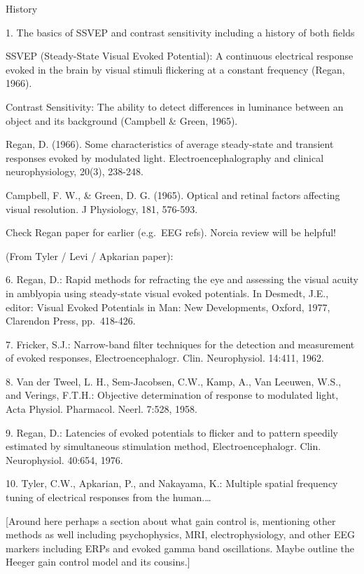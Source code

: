 \documentclass[
  letterpaper,
  DIV=11,
  numbers=noendperiod]{scrartcl}
\begin{document}
\label{anchor-2}{}History

\label{anchor-3}{}1. The basics of SSVEP and contrast
sensitivity including a history of both fields

SSVEP (Steady-State Visual Evoked Potential): A continuous electrical
response evoked in the brain by visual stimuli flickering at a constant
frequency (Regan, 1966).

Contrast Sensitivity: The ability to detect differences in luminance
between an object and its background (Campbell \& Green, 1965).

Regan, D. (1966). Some characteristics of average steady-state and
transient responses evoked by modulated light. Electroencephalography
and clinical neurophysiology, 20(3), 238-248.

Campbell, F. W., \& Green, D. G. (1965). Optical and retinal factors
affecting visual resolution. J Physiology, 181, 576-593.

Check Regan paper for earlier (e.g.~EEG refs). Norcia review will be
helpful!

(From Tyler / Levi / Apkarian paper):

6. Regan, D.: Rapid methods for refracting the eye and assessing the
visual acuity in amblyopia using steady-state visual evoked potentials.
In Desmedt, J.E., editor: Visual Evoked Potentials in Man: New
Developments, Oxford, 1977, Clarendon Press, pp.~418-426.

7. Fricker, S.J.: Narrow-band filter techniques for the detection and
measurement of evoked responses, Electroencephalogr. Clin. Neurophysiol.
14:411, 1962.

8. Van der Tweel, L. H., Sem-Jacobsen, C.W., Kamp, A., Van Leeuwen,
W.S., and Verings, F.T.H.: Objective determination of response to
modulated light, Acta Physiol. Pharmacol. Neerl. 7:528, 1958.

9. Regan, D.: Latencies of evoked potentials to flicker and to pattern
speedily estimated by simultaneous stimulation method,
Electroencephalogr. Clin. Neurophysiol. 40:654, 1976.

10. Tyler, C.W., Apkarian, P., and Nakayama, K.: Multiple spatial
frequency tuning of electrical responses from the human.\ldots{}

{[}Around here perhaps a section about what gain control is, mentioning
other methods as well including psychophysics, MRI, electrophysiology,
and other EEG markers including ERPs and evoked gamma band oscillations.
Maybe outline the Heeger gain control model and its cousins.{]}
\end{document}
